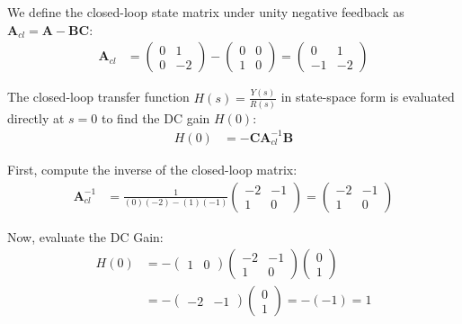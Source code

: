 \documentclass[journal,12pt,onecolumn]{IEEEtran}
\theoremstyle{remark}
\begin{document}
We define the closed-loop state matrix under unity negative feedback as $\mathbf{A}_{cl} = \mathbf{A} - \mathbf{B}\mathbf{C}$:
\begin{align*}
\mathbf{A}_{cl} &= \begin{pmatrix} 0 & 1 \\ 0 & -2 \end{pmatrix} - \begin{pmatrix} 0 & 0 \\ 1 & 0 \end{pmatrix} = \begin{pmatrix} 0 & 1 \\ -1 & -2 \end{pmatrix}
\end{align*}

The closed-loop transfer function $H(s) = \frac{Y(s)}{R(s)}$ in state-space form is evaluated directly at $s = 0$ to find the DC gain $H(0)$:
\begin{align*}
H(0) &= -\mathbf{C}\mathbf{A}_{cl}^{-1}\mathbf{B}
\end{align*}

First, compute the inverse of the closed-loop matrix:
\begin{align*}
\mathbf{A}_{cl}^{-1} &= \frac{1}{(0)(-2) - (1)(-1)} \begin{pmatrix} -2 & -1 \\ 1 & 0 \end{pmatrix} = \begin{pmatrix} -2 & -1 \\ 1 & 0 \end{pmatrix}
\end{align*}

Now, evaluate the DC Gain:
\begin{align*}
H(0) &= -\begin{pmatrix} 1 & 0 \end{pmatrix} \begin{pmatrix} -2 & -1 \\ 1 & 0 \end{pmatrix} \begin{pmatrix} 0 \\ 1 \end{pmatrix} \\
&= -\begin{pmatrix} -2 & -1 \end{pmatrix} \begin{pmatrix} 0 \\ 1 \end{pmatrix} = -(-1) = 1
\end{align*}
\end{document}
